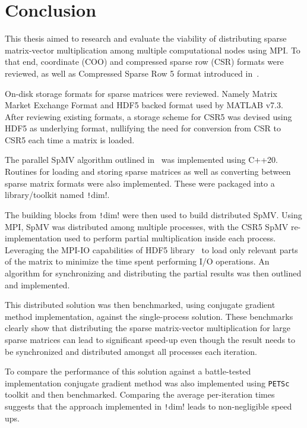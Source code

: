 \documentclass[thesis=M,english]{FITthesis}[2019/12/23]
\newcommand{\csre}[1]{\texttt!#1!}
\begin{document}
\chapter{Conclusion}

This thesis aimed to research and evaluate the viability of distributing sparse matrix-vector multiplication
among multiple computational nodes using MPI\@. To that end, coordinate (COO) and compressed sparse row (CSR) formats
were reviewed, as well as Compressed Sparse Row 5 format introduced in~\cite{liu2015csr5}.

On-disk storage formats for sparse matrices were reviewed. Namely Matrix Market Exchange Format
and HDF5 backed format used by MATLAB v7.3. After reviewing existing formats, a storage scheme for CSR5 was
devised
using HDF5 as underlying format, nullifying the need for conversion from CSR to CSR5 each time a matrix
is loaded.

The parallel SpMV algorithm outlined in~\cite{liu2015csr5} was implemented using C++20. Routines for
loading and storing sparse matrices as well as converting between sparse matrix formats were
also implemented. These were packaged into a library/toolkit named \csre{dim}.

The building blocks from \csre{dim} were then used to build distributed SpMV\@. Using MPI, SpMV was
distributed among multiple processes, with the CSR5 SpMV re-implementation used to perform partial
multiplication inside each process. Leveraging the MPI-IO capabilities of HDF5 library~\cite{hdf5} to load only
relevant parts of the matrix to minimize the time spent performing I/O operations. An algorithm for
synchronizing and distributing the partial results was then outlined and implemented.

This distributed solution was then benchmarked, using conjugate gradient method implementation, against the
single-process solution. These benchmarks clearly show that distributing the sparse matrix-vector multiplication
for large sparse matrices can lead to significant speed-up even though the result needs to be synchronized
and distributed amongst all processes each iteration.

To compare the performance of this solution against a battle-tested implemen\-tation conjugate gradient method
was also implemented using \texttt{PETSc} toolkit and then benchmarked. Comparing the average per-iteration times
suggests that the approach implemented in \csre{dim} leads to non-negligible speed ups.
\end{document}
